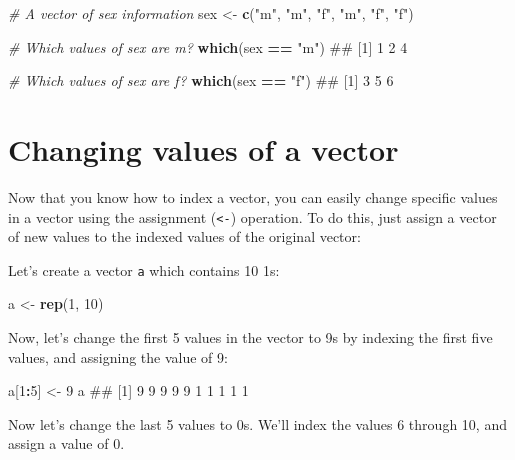 \documentclass[]{book}
\newenvironment{Shaded}{\begin{snugshade}}{\end{snugshade}}
\newcommand{\KeywordTok}[1]{\textcolor[rgb]{0.13,0.29,0.53}{\textbf{#1}}}
\newcommand{\DecValTok}[1]{\textcolor[rgb]{0.00,0.00,0.81}{#1}}
\newcommand{\StringTok}[1]{\textcolor[rgb]{0.31,0.60,0.02}{#1}}
\newcommand{\CommentTok}[1]{\textcolor[rgb]{0.56,0.35,0.01}{\textit{#1}}}
\newcommand{\OperatorTok}[1]{\textcolor[rgb]{0.81,0.36,0.00}{\textbf{#1}}}
\newcommand{\NormalTok}[1]{#1}
\theoremstyle{definition}
\theoremstyle{definition}
\theoremstyle{remark}
\begin{document}
\begin{Shaded}
\begin{Highlighting}[]
\CommentTok{# A vector of sex information}
\NormalTok{sex <-}\StringTok{ }\KeywordTok{c}\NormalTok{(}\StringTok{"m"}\NormalTok{, }\StringTok{"m"}\NormalTok{, }\StringTok{"f"}\NormalTok{, }\StringTok{"m"}\NormalTok{, }\StringTok{"f"}\NormalTok{, }\StringTok{"f"}\NormalTok{)}

\CommentTok{# Which values of sex are m?}
\KeywordTok{which}\NormalTok{(sex }\OperatorTok{==}\StringTok{ "m"}\NormalTok{)}
\NormalTok{## [1] 1 2 4}

\CommentTok{# Which values of sex are f?}
\KeywordTok{which}\NormalTok{(sex }\OperatorTok{==}\StringTok{ "f"}\NormalTok{)}
\NormalTok{## [1] 3 5 6}
\end{Highlighting}
\end{Shaded}

\section{Changing values of a vector}\label{changing-values-of-a-vector}

Now that you know how to index a vector, you can easily change specific
values in a vector using the assignment (\texttt{\textless{}-})
operation. To do this, just assign a vector of new values to the indexed
values of the original vector:

Let's create a vector \texttt{a} which contains 10 1s:

\begin{Shaded}
\begin{Highlighting}[]
\NormalTok{a <-}\StringTok{ }\KeywordTok{rep}\NormalTok{(}\DecValTok{1}\NormalTok{, }\DecValTok{10}\NormalTok{)}
\end{Highlighting}
\end{Shaded}

Now, let's change the first 5 values in the vector to 9s by indexing the
first five values, and assigning the value of 9:

\begin{Shaded}
\begin{Highlighting}[]
\NormalTok{a[}\DecValTok{1}\OperatorTok{:}\DecValTok{5}\NormalTok{] <-}\StringTok{ }\DecValTok{9}
\NormalTok{a}
\NormalTok{##  [1] 9 9 9 9 9 1 1 1 1 1}
\end{Highlighting}
\end{Shaded}

Now let's change the last 5 values to 0s. We'll index the values 6
through 10, and assign a value of 0.
\end{document}
